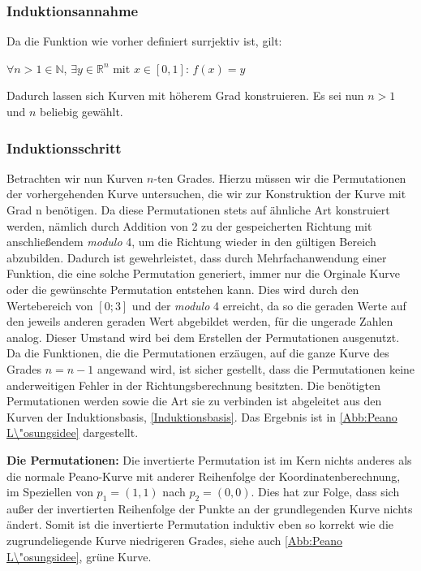 \documentclass[course=asp]{aspdoc}
\begin{document}
\subsubsection{Induktionsannahme} \label{Induktionsannahme}
Da die Funktion wie vorher definiert surrjektiv ist, gilt:

\begin{center}
$\forall n > 1 \in \mathbb{N}$, $\exists y \in \mathbb{R}^n$ mit $x \in [0,1]$: $f(x)= y$	%
\end{center}

Dadurch lassen sich Kurven mit h\"oherem Grad konstruieren. Es sei nun $n > 1$ und $n$ beliebig gew\"ahlt.

\subsubsection{Induktionsschritt} \label{Induktionsschritt}
Betrachten wir nun Kurven $n$-ten Grades. Hierzu m\"ussen wir die Permutationen der vorhergehenden Kurve untersuchen, die wir zur Konstruktion der Kurve mit Grad n ben\"otigen.
Da diese Permutationen stets auf \"ahnliche Art konstruiert werden, n\"amlich durch Addition von 2 zu der gespeicherten Richtung mit anschlie\ss endem \textit{modulo} 4, um die Richtung wieder in den g\"ultigen Bereich abzubilden. Dadurch ist gewehrleistet, dass durch Mehrfachanwendung einer Funktion, die eine solche Permutation generiert, immer nur die Orginale Kurve oder die gew\"unschte Permutation entstehen kann. Dies wird durch den Wertebereich von $[0;3]$ und der \textit{modulo} 4 erreicht, da so die geraden Werte auf den jeweils anderen geraden Wert abgebildet werden, f\"ur die ungerade Zahlen analog. Dieser Umstand wird bei dem Erstellen der Permutationen ausgenutzt.
Da die Funktionen, die die Permutationen erz\"augen, auf die ganze Kurve des Grades $n = n - 1$ angewand wird, ist sicher gestellt, dass die Permutationen keine anderweitigen Fehler in der Richtungsberechnung besitzten.
Die ben\"otigten Permutationen werden sowie die Art sie zu verbinden ist abgeleitet aus den Kurven der Induktionsbasis, \ref{Induktionsbasis}. Das Ergebnis ist in \ref{Abb:Peano L\"osungsidee} dargestellt.

\textbf{Die Permutationen: }%
Die invertierte Permutation ist im Kern nichts anderes als die normale Peano-Kurve mit anderer Reihenfolge der Koordinatenberechnung, im Speziellen von $p_1=(1,1)$ nach $p_2 = (0,0)$. Dies hat zur Folge, dass sich au\ss er der invertierten Reihenfolge der Punkte an der grundlegenden Kurve nichts \"andert. Somit ist die invertierte Permutation induktiv eben so korrekt wie die zugrundeliegende Kurve niedrigeren Grades, siehe auch \ref{Abb:Peano L\"osungsidee}, gr\"une Kurve.
\end{document}
